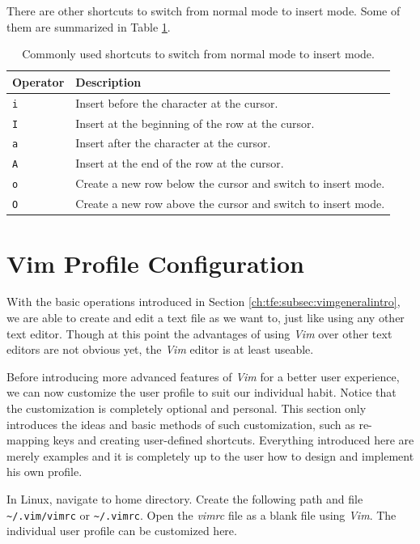 There are other shortcuts to switch from normal mode to insert mode. Some of them are summarized in Table \ref{ch:tfe:tab:switchtoinsert}.

\begin{table}
  \centering \caption{Commonly used shortcuts to switch from normal mode to insert mode.}\label{ch:tfe:tab:switchtoinsert}
  \begin{tabularx}{\textwidth}{lX}
    \hline
    Operator & Description \\ \hline
    \verb|i| & Insert before the character at the cursor. \\ \hdashline
    \verb|I| & Insert at the beginning of the row at the cursor. \\ \hdashline
    \verb|a| & Insert after the character at the cursor. \\ \hdashline
    \verb|A| & Insert at the end of the row at the cursor. \\ \hdashline
    \verb|o| & Create a new row below the cursor and switch to insert mode. \\ \hdashline
    \verb|O| & Create a new row above the cursor and switch to insert mode. \\
    \hline
  \end{tabularx}
\end{table}

\section{Vim Profile Configuration}

With the basic operations introduced in Section \ref{ch:tfe:subsec:vimgeneralintro}, we are able to create and edit a text file as we want to, just like using any other text editor. Though at this point the advantages of using \textit{Vim} over other text editors are not obvious yet, the \textit{Vim} editor is at least useable.

Before introducing more advanced features of \textit{Vim} for a better user experience, we can now customize the user profile to suit our individual habit. Notice that the customization is completely optional and personal. This section only introduces the ideas and basic methods of such customization, such as re-mapping keys and creating user-defined shortcuts. Everything introduced here are merely examples and it is completely up to the user how to design and implement his own profile.

In Linux, navigate to home directory. Create the following path and file \verb|~/.vim/vimrc| or \verb|~/.vimrc|. Open the \textit{vimrc} file as a blank file using \textit{Vim}. The individual user profile can be customized here.

